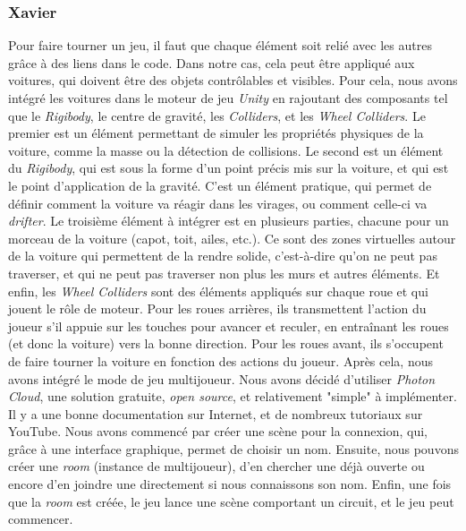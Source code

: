 \documentclass[a4paper,12pt]{article}
\begin{document}
    \subsubsection{Xavier}
        Pour faire tourner un jeu, il faut que chaque élément soit relié avec
        les autres grâce à des liens dans le code. Dans notre cas, cela peut être
        appliqué aux voitures, qui doivent être des objets contrôlables et visibles.
        Pour cela, nous avons intégré les voitures dans le moteur de jeu \textsl{Unity}
        en rajoutant des composants tel que le \textit{Rigibody}, le centre de gravité,
        les \textit{Colliders}, et les \textit{Wheel Colliders}. Le premier est un élément
        permettant de simuler les propriétés physiques de la voiture, comme la masse ou la
        détection de collisions. Le second est un élément du \textit{Rigibody}, qui est sous
        la forme d'un point précis mis sur la voiture, et qui est le point d'application
        de la gravité. C'est un élément pratique, qui permet de définir comment la
        voiture va réagir dans les virages, ou comment celle-ci va \textit{drifter}.
        Le troisième élément à intégrer est en plusieurs parties, chacune pour un morceau
        de la voiture (capot, toit, ailes, etc.). Ce sont des zones virtuelles autour
        de la voiture qui permettent de la rendre solide, c'est-à-dire qu'on ne peut pas
        traverser, et qui ne peut pas traverser non plus les murs et autres éléments.
        Et enfin, les \textit{Wheel Colliders} sont des éléments appliqués sur chaque roue
        et qui jouent le rôle de moteur. Pour les roues arrières, ils transmettent l'action
        du joueur s'il appuie sur les touches pour avancer et reculer, en entraînant les
        roues (et donc la voiture) vers la bonne direction. Pour les roues avant,
        ils s'occupent de faire tourner la voiture en fonction des actions du joueur.
        Après cela, nous avons intégré le mode de jeu multijoueur. Nous avons décidé
        d'utiliser \textsl{Photon Cloud}, une solution gratuite, \textit{open source},
        et relativement "simple" à implémenter. Il y a une bonne documentation sur
        Internet, et de nombreux tutoriaux sur YouTube. Nous avons commencé par
        créer une scène pour la connexion, qui, grâce à une interface graphique,
        permet de choisir un nom. Ensuite, nous pouvons créer une \textit{room}
        (instance de multijoueur), d'en chercher une déjà ouverte ou encore
        d'en joindre une directement si nous connaissons son nom. Enfin, une
        fois que la \textit{room} est créée, le jeu lance une scène comportant
        un circuit, et le jeu peut commencer.
\clearpage
\end{document}
